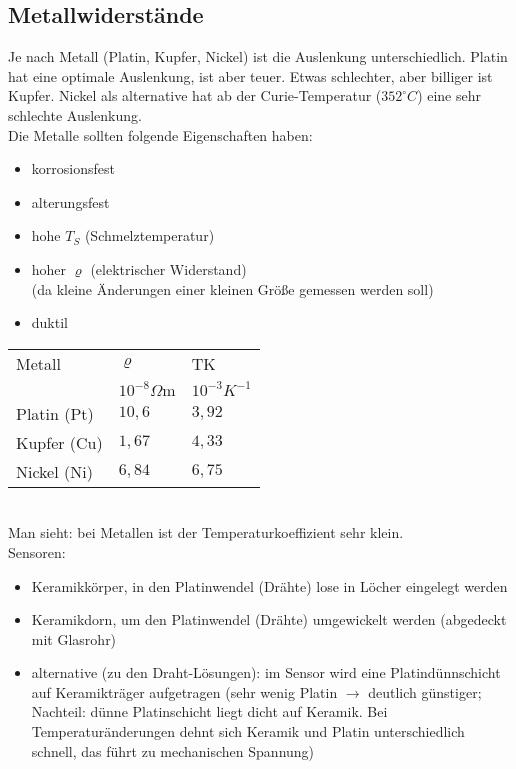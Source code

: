 \subsection{Metallwiderstände}
Je nach Metall (Platin, Kupfer, Nickel) ist die Auslenkung unterschiedlich. Platin hat eine optimale Auslenkung, ist aber teuer. Etwas schlechter, aber billiger ist Kupfer. Nickel als alternative hat ab der Curie-Temperatur ($352 ^\circ C$) eine sehr schlechte Auslenkung.\\
Die Metalle sollten folgende Eigenschaften haben:
\begin{itemize}
\item korrosionsfest
\item alterungsfest
\item hohe $T_S$ (Schmelztemperatur)
\item hoher $\varrho$ (elektrischer Widerstand)\\
(da kleine Änderungen einer kleinen Größe gemessen werden soll)
\item duktil
\end{itemize}
\begin{tabular}{l l l}
Metall & $\varrho $ & TK\\
&$ 10^{-8}\Omega \mathrm{m}$&$10^{-3}K^{-1}$\\
\hline
Platin (Pt) & $10,6$ & $3,92$\\
Kupfer (Cu) & $1,67$ & $4,33$\\
Nickel (Ni) & $6,84$ & $6,75$
\end{tabular}\\
Man sieht: bei Metallen ist der Temperaturkoeffizient sehr klein.\\
Sensoren:
\begin{itemize}
\item Keramikkörper, in den Platinwendel (Drähte) lose in Löcher eingelegt werden
\item Keramikdorn, um den Platinwendel (Drähte) umgewickelt werden (abgedeckt mit Glasrohr)
\item alternative (zu den Draht-Lösungen): im Sensor wird eine Platindünnschicht auf Keramikträger aufgetragen (sehr wenig Platin $\to$ deutlich günstiger; Nachteil: dünne Platinschicht liegt dicht auf Keramik. Bei Temperaturänderungen dehnt sich Keramik und Platin unterschiedlich schnell, das führt zu mechanischen Spannung)
\end{itemize}

